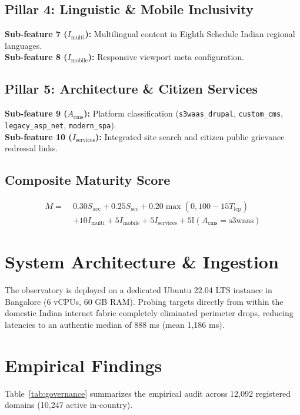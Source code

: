 \documentclass[conference]{IEEEtran}
\begin{document}
\subsection{Pillar 4: Linguistic \& Mobile Inclusivity}
\textbf{Sub-feature 7 ($I_{\text{multi}}$):} Multilingual content in Eighth Schedule Indian regional languages.\\
\textbf{Sub-feature 8 ($I_{\text{mobile}}$):} Responsive viewport meta configuration.

\subsection{Pillar 5: Architecture \& Citizen Services}
\textbf{Sub-feature 9 ($A_{\text{cms}}$):} Platform classification (\texttt{s3waas\_drupal}, \texttt{custom\_cms}, \texttt{legacy\_asp\_net}, \texttt{modern\_spa}).\\
\textbf{Sub-feature 10 ($I_{\text{services}}$):} Integrated site search and citizen public grievance redressal links.

\subsection{Composite Maturity Score}
\begin{equation}
\begin{aligned}
M = \; & 0.30 S_{\text{acc}} + 0.25 S_{\text{sec}} + 0.20 \max(0, 100 - 15 T_{\text{lcp}}) \\
& + 10 I_{\text{multi}} + 5 I_{\text{mobile}} + 5 I_{\text{services}} + 5 \mathbb{I}(A_{\text{cms}} = \text{s3waas})
\end{aligned}
\end{equation}

\section{System Architecture \& Ingestion}
The observatory is deployed on a dedicated Ubuntu 22.04 LTS instance in Bangalore (6 vCPUs, 60 GB RAM). Probing targets directly from within the domestic Indian internet fabric completely eliminated perimeter drops, reducing latencies to an authentic median of 888 ms (mean 1,186 ms).

\section{Empirical Findings}
Table~\ref{tab:governance} summarizes the empirical audit across 12,092 registered domains (10,247 active in-country).
\end{document}
